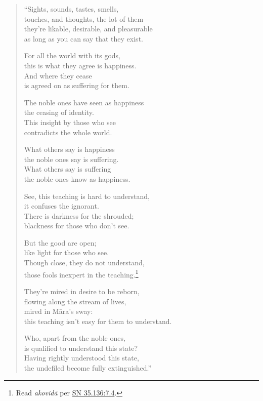 \documentclass[12pt,openany]{book}%
\begin{document}
\begin{verse}%
“Sights, sounds, tastes, smells, \\
touches, and thoughts, the lot of them—\\
they’re likable, desirable, and pleasurable \\
as long as you can say that they exist. 

For all the world with its gods, \\
this is what they agree is happiness. \\
And where they cease \\
is agreed on as suffering for them. 

The noble ones have seen as happiness \\
the ceasing of identity. \\
This insight by those who see \\
contradicts the whole world. 

What others say is happiness \\
the noble ones say is suffering. \\
What others say is suffering \\
the noble ones know as happiness. 

See, this teaching is hard to understand, \\
it confuses the ignorant. \\
There is darkness for the shrouded; \\
blackness for those who don’t see. 

But the good are open; \\
like light for those who see. \\
Though close, they do not understand, \\
those fools inexpert in the teaching.\footnote{Read \textit{\textsanskrit{akovidā}} per \href{https://suttacentral.net/sn35.136/en/sujato\#7.4}{SN 35.136:7.4}. } 

They’re mired in desire to be reborn, \\
flowing along the stream of lives, \\
mired in \textsanskrit{Māra}’s sway: \\
this teaching isn’t easy for them to understand. 

Who, apart from the noble ones, \\
is qualified to understand this state? \\
Having rightly understood this state, \\
the undefiled become fully extinguished.” 

%
\end{verse}
\end{document}
